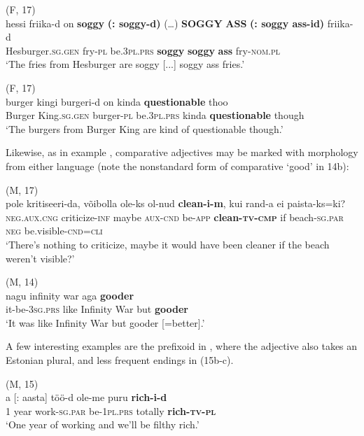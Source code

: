 \documentclass[output=paper]{langscibook}
\begin{document}
\ex  (F, 17)\\\label{ex:vihmanetal:13b}
\gll hessi       friika-d on     {\textbf{{soggy}} \textbf{{(:} \textbf{soggy-d)}} (…)}   \textbf{SOGGY} {\textbf{ASS} \textbf{{(:} \textbf{soggy} \textbf{ass-id)}}  }  friika-d\\
Hesburger.\textsc{sg.gen}   fry{}-\textsc{pl}   be.3\textsc{pl.prs}   \textbf{soggy}   \textbf{soggy}   \textbf{ass}           fry{}-\textsc{nom.pl}\\
\glt ‘The fries from Hesburger are soggy [...] soggy ass fries.’

\ex  (F, 17)\\\label{ex:vihmanetal:13c}
\gll burger   kingi     burgeri-d   on     kinda \textbf{{questionable}}   thoo\\
Burger   King.\textsc{sg.gen} burger{}-\textsc{pl}   be.3\textsc{pl.prs}   kinda \textbf{questionable}   though\\
\glt ‘The burgers from Burger King are kind of questionable though.’
\z
\z


Likewise, as in example , comparative adjectives may be marked with morphology from either language (note the nonstandard form of comparative ‘good’ in 14b):

\ea%
    \label{ex:vihmanetal:14}
\ea  (M, 17)\\ \label{ex:vihmanetal:14a}
\gll pole     kritiseeri-da,   võibolla ole-ks   ol-nud \textbf{clean-i-m},   kui  rand-a    ei     paista-ks=ki?
\\
\textsc{neg.aux.cng}  criticize{}-\textsc{inf}  maybe   \textsc{aux-cnd}  be{}-\textsc{app} \textbf{clean{}-}\textbf{\textsc{tv-cmp}}   if   beach{}-\textsc{sg.par}   \textsc{neg} be.visible{}-\textsc{cnd=cli}\\
\glt ‘There’s nothing to criticize, maybe it would have been cleaner if the beach weren’t visible?’

\ex  (M, 14)\\ \label{ex:vihmanetal:14b}
    nagu  infinity war  aga  \textbf{{gooder}}\\
it-be{}-3\textsc{sg.prs}    like  Infinity War  but  \textbf{gooder}\\
\glt ‘It was like Infinity War but gooder [=better].’
    \z
\z


A few interesting examples are the prefixoid in , where the adjective also takes an Estonian plural, and less frequent endings in (15b-c).

\ea%
    \label{ex:vihmanetal:15}
\ea  (M, 15)\\ \label{ex:vihmanetal:15a}
 {a [: aasta]}  töö-d    ole-me   puru \textbf{{rich-i-d}}\\
         1 year     work{}-\textsc{sg.par}   be{}-1\textsc{pl.prs}   totally \textbf{rich{}-}\textbf{\textsc{tv-pl}}\\
\glt ‘One year of working and we’ll be filthy rich.’
\end{document}
